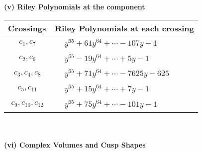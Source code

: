 \documentclass[1p]{elsarticle_modified}
\theoremstyle{definition}
\begin{document}
\newpage\renewcommand{\arraystretch}{1}
\flushleft \textbf{(v) Riley Polynomials at the component}\newline \\
\begin{tabular}{m{50pt}|m{274pt}}
Crossings & \hspace{64pt}Riley Polynomials at each crossing \\
\hline $$\begin{aligned}c_{1},c_{7}\end{aligned}$$&$\begin{aligned}
&y^{65}+61 y^{64}+\cdots-107 y-1
\end{aligned}$\\
\hline $$\begin{aligned}c_{2},c_{6}\end{aligned}$$&$\begin{aligned}
&y^{65}-19 y^{64}+\cdots+5 y-1
\end{aligned}$\\
\hline $$\begin{aligned}c_{3},c_{4},c_{8}\end{aligned}$$&$\begin{aligned}
&y^{65}+71 y^{64}+\cdots-7625 y-625
\end{aligned}$\\
\hline $$\begin{aligned}c_{5},c_{11}\end{aligned}$$&$\begin{aligned}
&y^{65}+15 y^{64}+\cdots+7 y-1
\end{aligned}$\\
\hline $$\begin{aligned}c_{9},c_{10},c_{12}\end{aligned}$$&$\begin{aligned}
&y^{65}+75 y^{64}+\cdots-101 y-1
\end{aligned}$\\
\hline
\end{tabular}\\~\\
\newpage\flushleft \textbf{(vi) Complex Volumes and Cusp Shapes}
\end{document}
